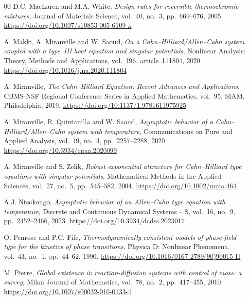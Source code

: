 \documentclass[final,1p,times]{elsarticle}
\numberwithin{equation}{section}
\begin{document}
\begin{thebibliography}{00}
	D.C. MacLaren and M.A. White,
	\textit{Design rules for reversible thermochromic mixtures},
	Journal of Materials Science, vol.~40, no.~3, pp.~669--676, 2005.
	\newblock \url{https://doi.org/10.1007/s10853-005-6109-x}
	
	A. Makki, A. Miranville and W. Saoud,
	\textit{On a Cahn--Hilliard/Allen--Cahn system coupled with a type~{III}
		heat equation and singular potentials},
	Nonlinear Analysis: Theory, Methods and Applications, vol.~196,
	article~111804, 2020.
	\newblock \url{https://doi.org/10.1016/j.na.2020.111804}
	
	A. Miranville,
	\textit{The Cahn--Hilliard Equation: Recent Advances and Applications},
	CBMS-NSF Regional Conference Series in Applied Mathematics, vol.~95,
	SIAM, Philadelphia, 2019.
	\newblock \url{https://doi.org/10.1137/1.9781611975925}
	
	A. Miranville, R. Quintanilla and W. Saoud,
	\textit{Asymptotic behavior of a Cahn--Hilliard/Allen--Cahn system
		with temperature},
	Communications on Pure and Applied Analysis, vol.~19, no.~4,
	pp.~2257--2288, 2020.
	\newblock \url{https://doi.org/10.3934/cpaa.2020099}
	
	A. Miranville and S. Zelik,
	\textit{Robust exponential attractors for Cahn--Hilliard type equations
		with singular potentials},
	Mathematical Methods in the Applied Sciences, vol.~27, no.~5,
	pp.~545--582, 2004.
	\newblock \url{https://doi.org/10.1002/mma.464}
	
	A.J. Ntsokongo,
	\textit{Asymptotic behavior of an Allen--Cahn type equation with temperature},
	Discrete and Continuous Dynamical Systems -- S, vol.~16, no.~9,
	pp.~2452--2466, 2023.
	\newblock \url{https://doi.org/10.3934/dcdss.2023017}
	
	O. Penrose and P.C. Fife,
	\textit{Thermodynamically consistent models of phase-field type for the
		kinetics of phase transitions},
	Physica D: Nonlinear Phenomena, vol.~43, no.~1, pp.~44--62, 1990.
	\newblock \url{https://doi.org/10.1016/0167-2789(90)90015-H}
	
	M. Pierre,
	\textit{Global existence in reaction-diffusion systems with control of mass:
		a survey},
	Milan Journal of Mathematics, vol.~78, no.~2, pp.~417--455, 2010.
	\newblock \url{https://doi.org/10.1007/s00032-010-0133-4}
	

\end{thebibliography}
\end{document}
